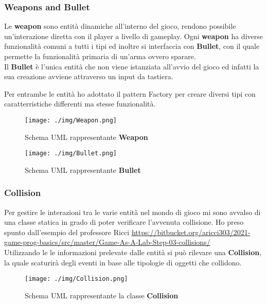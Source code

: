 \subsubsection*{Weapons and Bullet}

Le \textbf {weapon} sono entità dinamiche all'interno del gioco, rendono possibile un'interazione diretta con il player a livello di gameplay.
Ogni \textbf{weapon} ha diverse funzionalità comuni a tutti i tipi ed inoltre si interfaccia con \textbf{Bullet}, con il quale permette la funzionalità primaria di un'arma ovvero sparare.\\

Il \textbf{Bullet} è l'unica entità che non viene istanziata all'avvio del gioco ed infatti la sua creazione avviene attraverso un input da tastiera.

Per entrambe le entità ho adottato il pattern Factory per creare diversi tipi con caratterristiche differenti ma stesse funzionalità.

\begin{figure}[H]
	\centering{}
	\texttt{[image: ./img/Weapon.png]}
	\label{img:Weapon.png}
	\caption{Schema UML rappresentante \textbf{Weapon}}
\end{figure}

\begin{figure}[H]
	\centering{}
	\texttt{[image: ./img/Bullet.png]}
	\label{img:Weapon.png}
	\caption{Schema UML rappresentante \textbf{Bullet}}
\end{figure}

\subsubsection*{Collision}

Per gestire le interazioni tra le varie entità nel mondo di gioco mi sono avvalso di una classe statica in grado di poter verificare l'avvenuta collisione.
Ho preso spunto dall'esempio del professore Ricci \url{https://bitbucket.org/aricci303/2021-game-prog-basics/src/master/Game-As-A-Lab-Step-03-collisions/}\\

Utilizzando le le informazioni prelevate dalle entità si può rilevare una \textbf{Collision}, la quale scaturirà degli eventi in base alle tipologie di oggetti che collidono.  

\begin{figure}[H]
	\centering{}
	\texttt{[image: ./img/Collision.png]}
	\label{img:Collision.png}
	\caption{Schema UML rappresentante la classe \textbf{Collision}}
\end{figure}

